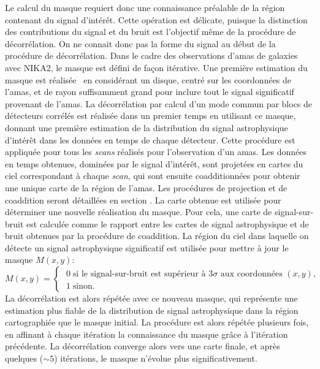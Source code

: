 Le calcul du masque requiert donc une connaissance préalable de la région contenant du signal d'intérêt.
Cette opération est délicate, puisque la distinction des contributions du signal et du bruit est l'objectif même de la procédure de décorrélation.
On ne connait donc pas la forme du signal au début de la procédure de décorrélation.
Dans le cadre des observations d'amas de galaxies avec NIKA2, le masque est défini de façon itérative.
Une première estimation du masque est réalisée \prior\ en considérant un disque, centré sur les coordonnées de l'amas, et de rayon suffisamment grand pour inclure tout le signal significatif provenant de l'amas.
La décorrélation par calcul d'un mode commun par blocs de détecteurs corrélés est réalisée dans un premier temps en utilisant ce masque, donnant une première estimation de la distribution du signal astrophysique d'intérêt dans les données en temps de chaque détecteur.
Cette procédure est appliquée pour tous les \textit{scans} réalisés pour l'observation d'un amas.
Les données en temps obtenues, dominées par le signal d'intérêt, sont projetées en cartes du ciel correspondant à chaque \textit{scan}, qui sont ensuite coadditionnées pour obtenir une unique carte de la région de l'amas.
Les procédures de projection et de coaddition seront détaillées en section .
La carte obtenue est utilisée pour déterminer une nouvelle réalisation du masque.
Pour cela, une carte de signal-sur-bruit est calculée comme le rapport entre les cartes de signal astrophysique et de bruit obtenues par la procédure de coaddition.
La région du ciel dans laquelle on détecte un signal astrophysique significatif est utilisée pour mettre à jour le masque $M(x, y)$:
\begin{equation}
    M(x, y) =
        \begin{cases}
            \; 0 \;\text{si le signal-sur-bruit est supérieur à $3\sigma$ aux coordonnées $(x, y)$}, \\
            \; 1 \;\text{sinon.}
        \end{cases}
\end{equation}
La décorrélation est alors répétée avec ce nouveau masque, qui représente une estimation plus fiable de la distribution de signal astrophysique dans la région cartographiée que le masque initial.
La procédure est alors répétée plusieurs fois, en affinant à chaque itération la connaissance du masque grâce à l'itération précédente.
La décorrélation converge alors vers une carte finale, et après quelques ($\sim 5$) itérations, le masque n'évolue plus significativement.

